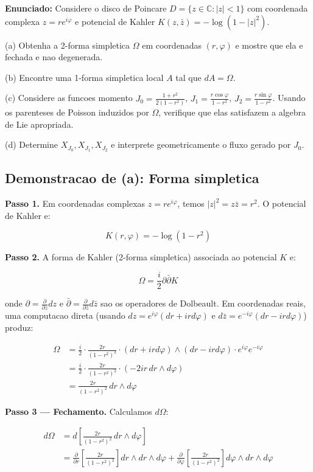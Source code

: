 \documentclass[12pt,a4paper,oneside]{article}
\begin{document}
\textbf{Enunciado:} Considere o disco de Poincare $D = \{z \in \mathbb{C} :
|z| < 1\}$ com coordenada complexa $z = re^{i\varphi}$ e potencial de Kahler
$K(z,\bar{z}) = -\log(1 - |z|^2)$.

(a) Obtenha a 2-forma simpletica $\Omega$ em coordenadas $(r,\varphi)$ e
mostre que ela e fechada e nao degenerada.

(b) Encontre uma 1-forma simpletica local $A$ tal que $dA = \Omega$.

(c) Considere as funcoes momento $J_0 = \frac{1+r^2}{2(1-r^2)}$,
$J_1 = \frac{r\cos\varphi}{1-r^2}$, $J_2 = \frac{r\sin\varphi}{1-r^2}$.
Usando os parenteses de Poisson induzidos por $\Omega$, verifique que
elas satisfazem a algebra de Lie apropriada.

(d) Determine $X_{J_0}, X_{J_1}, X_{J_2}$ e interprete geometricamente o
fluxo gerado por $J_0$.

\subsection*{Demonstracao de (a): Forma simpletica}

\textbf{Passo 1.} Em coordenadas complexas $z = re^{i\varphi}$, temos
$|z|^2 = z\bar{z} = r^2$. O potencial de Kahler e:

$$K(r,\varphi) = -\log(1 - r^2)$$

\textbf{Passo 2.} A forma de Kahler (2-forma simpletica) associada ao
potencial $K$ e:

$$\Omega = \frac{i}{2}\partial\bar{\partial}K$$

onde $\partial = \frac{\partial}{\partial z}dz$ e
$\bar{\partial} = \frac{\partial}{\partial\bar{z}}d\bar{z}$ sao os
operadores de Dolbeault. Em coordenadas reais, uma computacao direta
(usando $dz = e^{i\varphi}(dr + ir d\varphi)$ e
$d\bar{z} = e^{-i\varphi}(dr - ir d\varphi)$) produz:

\begin{align*}
\Omega &= \frac{i}{2} \cdot \frac{2r}{(1-r^2)^2} \cdot
(dr + ir d\varphi) \wedge (dr - ir d\varphi) \cdot e^{i\varphi}e^{-i\varphi} \\
&= \frac{i}{2} \cdot \frac{2r}{(1-r^2)^2} \cdot (-2ir\, dr\wedge d\varphi) \\
&= \frac{2r}{(1-r^2)^2} \, dr \wedge d\varphi
\end{align*}

\textbf{Passo 3 — Fechamento.} Calculamos $d\Omega$:

\begin{align*}
d\Omega &= d\left[\frac{2r}{(1-r^2)^2} \, dr \wedge d\varphi\right] \\
&= \frac{\partial}{\partial r}\left[\frac{2r}{(1-r^2)^2}\right] dr \wedge dr \wedge d\varphi
+ \frac{\partial}{\partial\varphi}\left[\frac{2r}{(1-r^2)^2}\right] d\varphi \wedge dr \wedge d\varphi
\end{align*}
\end{document}
